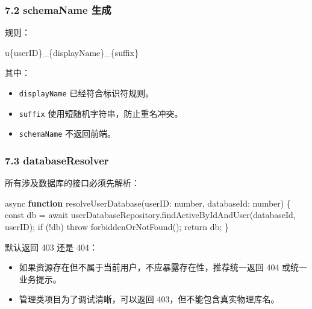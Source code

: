 \documentclass[
  a4paper,
  UTF8]{ctexart}
\newenvironment{Shaded}{}{}
\newcommand{\DataTypeTok}[1]{\textcolor[rgb]{0.56,0.13,0.00}{#1}}
\newcommand{\FunctionTok}[1]{\textcolor[rgb]{0.02,0.16,0.49}{#1}}
\newcommand{\KeywordTok}[1]{\textcolor[rgb]{0.00,0.44,0.13}{\textbf{#1}}}
\newcommand{\NormalTok}[1]{#1}
\newcommand{\OperatorTok}[1]{\textcolor[rgb]{0.40,0.40,0.40}{#1}}
\providecommand{\tightlist}{%
  \setlength{\itemsep}{0pt}\setlength{\parskip}{0pt}}
\begin{document}
\hypertarget{schemaname-ux751fux6210}{%
\subsubsection{7.2 schemaName 生成}\label{schemaname-ux751fux6210}}

规则：

\begin{Shaded}
\begin{Highlighting}[]
\NormalTok{u\{userID\}\_\{displayName\}\_\{suffix\}}
\end{Highlighting}
\end{Shaded}

其中：

\begin{itemize}
\tightlist
\item
  \texttt{displayName} 已经符合标识符规则。
\item
  \texttt{suffix} 使用短随机字符串，防止重名冲突。
\item
  \texttt{schemaName} 不返回前端。
\end{itemize}

\hypertarget{databaseresolver}{%
\subsubsection{7.3 databaseResolver}\label{databaseresolver}}

所有涉及数据库的接口必须先解析：

\begin{Shaded}
\begin{Highlighting}[]
\NormalTok{async }\KeywordTok{function} \FunctionTok{resolveUserDatabase}\NormalTok{(userID}\OperatorTok{:} \DataTypeTok{number}\OperatorTok{,}\NormalTok{ databaseId}\OperatorTok{:} \DataTypeTok{number}\NormalTok{) \{}
\NormalTok{  const db }\OperatorTok{=}\NormalTok{ await userDatabaseRepository}\OperatorTok{.}\FunctionTok{findActiveByIdAndUser}\NormalTok{(databaseId}\OperatorTok{,}\NormalTok{ userID)}\OperatorTok{;}
  \FunctionTok{if}\NormalTok{ (}\OperatorTok{!}\NormalTok{db) throw }\FunctionTok{forbiddenOrNotFound}\NormalTok{()}\OperatorTok{;}
\NormalTok{  return db}\OperatorTok{;}
\NormalTok{\}}
\end{Highlighting}
\end{Shaded}

默认返回 403 还是 404：

\begin{itemize}
\tightlist
\item
  如果资源存在但不属于当前用户，不应暴露存在性，推荐统一返回 404
  或统一业务提示。
\item
  管理类项目为了调试清晰，可以返回 403，但不能包含真实物理库名。
\end{itemize}
\end{document}
